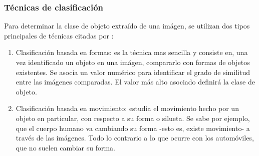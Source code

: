 \documentclass[a4paper,12pt,twoside]{article}
\begin{document}
\subsubsection{Técnicas de clasificación}
Para determinar la clase de objeto extraído de una imágen, se utilizan dos tipos principales de técnicas citadas por \cite{lozano}:
\begin{enumerate}
	\baselineskip 0pt
	\item Clasificación basada en formas: es la técnica mas sencilla y consiste en, una vez identificado un objeto en una imágen, compararlo con formas de objetos existentes. Se asocia un valor numérico para identificar el grado de similitud entre las imágenes comparadas. El valor más alto asociado definirá la clase de objeto.\\
	\item Clasificación basada en movimiento: estudia el movimiento hecho por un objeto en particular, con respecto a su forma o silueta. Se sabe por ejemplo, que el cuerpo humano va cambiando su forma -esto es, existe movimiento- a través de las imágenes. Todo lo contrario a lo que ocurre con los automóviles, que no suelen cambiar su forma.
	\\
\end{enumerate}	\baselineskip 14pt
\end{document}
